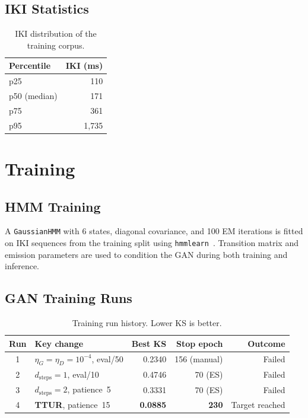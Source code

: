 \documentclass[sigconf,nonacm]{acmart}
\begin{document}
\subsection{IKI Statistics}

\begin{table}[t]
\centering
\caption{IKI distribution of the training corpus.}
\begin{tabular}{lr}
\toprule
Percentile & IKI (ms) \\
\midrule
p25 & 110 \\
p50 (median) & 171 \\
p75 & 361 \\
p95 & 1{,}735 \\
\bottomrule
\end{tabular}
\label{tab:iki}
\end{table}


\section{Training}

\subsection{HMM Training}

A \texttt{GaussianHMM} with 6 states, diagonal covariance, and 100 EM
iterations is fitted on IKI sequences from the training split using
\texttt{hmmlearn}~\cite{hmmlearn}.
Transition matrix and emission parameters are used to condition the GAN
during both training and inference.

\subsection{GAN Training Runs}

\begin{table}[t]
\centering
\caption{Training run history. Lower KS is better.}
\begin{tabular}{clrrr}
\toprule
Run & Key change & Best KS & Stop epoch & Outcome \\
\midrule
1 & $\eta_G{=}\eta_D{=}10^{-4}$, eval/50  & 0.2340 & 156 (manual) & Failed \\
2 & $d_\text{steps}{=}1$, eval/10          & 0.4746 & 70 (ES)      & Failed \\
3 & $d_\text{steps}{=}2$, patience~5       & 0.3331 & 70 (ES)      & Failed \\
4 & \textbf{TTUR}, patience~15            & \textbf{0.0885} & \textbf{230} & Target reached \\
\bottomrule
\end{tabular}
\label{tab:runs}
\end{table}
\end{document}
